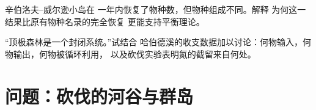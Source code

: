 \begin{exercise}[$\star\star\star$]\label{exo:b1:ecosystem-dynamics:11}
辛伯洛夫–威尔逊小岛在
一年内恢复了物种数，但物种组成不同。解释
为何这一结果比原有物种名录的完全恢复
更能支持平衡理论。
\end{exercise}

\begin{exercise}[$\star\star\star$]\label{exo:b1:ecosystem-dynamics:12}
“顶极森林是一个封闭系统。”试结合
哈伯德溪的收支数据加以讨论：何物输入，何物输出，何物被循环利用，
以及砍伐实验表明氮的截留来自何处。
\end{exercise}

\section{问题：砍伐的河谷与群岛}

